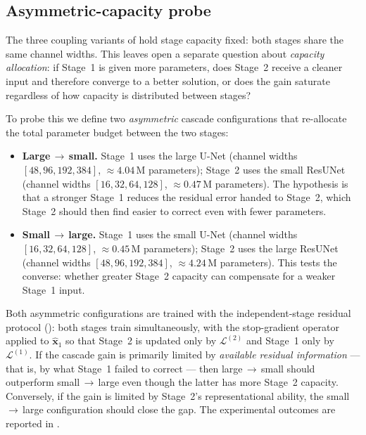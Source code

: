 \subsection{Asymmetric-capacity probe}
\label{subsec:meth_asymmetric}

The three coupling variants of  hold stage capacity fixed:
both stages share the same channel widths. This leaves open a separate question about
\emph{capacity allocation}: if Stage~1 is given more parameters, does Stage~2 receive a cleaner
input and therefore converge to a better solution, or does the gain saturate regardless of how
capacity is distributed between stages?

To probe this we define two \emph{asymmetric} cascade configurations that re-allocate the total
parameter budget between the two stages:
\begin{itemize}
    \item \textbf{Large\,$\to$\,small.} Stage~1 uses the large U-Net (channel widths
        $[48,96,192,384]$, ${\approx}4.04$\,M parameters); Stage~2 uses the small ResUNet
        (channel widths $[16,32,64,128]$, ${\approx}0.47$\,M parameters). The hypothesis is
        that a stronger Stage~1 reduces the residual error handed to Stage~2, which Stage~2
        should then find easier to correct even with fewer parameters.
    \item \textbf{Small\,$\to$\,large.} Stage~1 uses the small U-Net (channel widths
        $[16,32,64,128]$, ${\approx}0.45$\,M parameters); Stage~2 uses the large ResUNet
        (channel widths $[48,96,192,384]$, ${\approx}4.24$\,M parameters). This tests the converse:
        whether greater Stage~2 capacity can compensate for a weaker Stage~1 input.
\end{itemize}
Both asymmetric configurations are trained with the independent-stage residual protocol
(): both stages train simultaneously, with the stop-gradient
operator applied to $\hat{\mathbf{x}}_{1}$ so that Stage~2 is updated only by
$\mathcal{L}^{(2)}$ and Stage~1 only by $\mathcal{L}^{(1)}$. If the cascade gain is primarily
limited by \emph{available residual information} --- that is, by what Stage~1 failed to correct
--- then large\,$\to$\,small should outperform small\,$\to$\,large even though the latter has
more Stage~2 capacity. Conversely, if the gain is limited by Stage~2's representational ability,
the small\,$\to$\,large configuration should close the gap. The experimental outcomes are reported
in .

